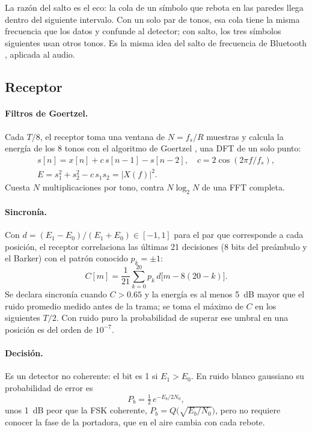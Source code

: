 \documentclass[10pt,twocolumn,letterpaper]{article}
\begin{document}
La razón del salto es el eco: la cola de un símbolo que rebota en las paredes llega dentro del siguiente intervalo. Con un solo par de tonos, esa cola tiene la misma frecuencia que los datos y confunde al detector; con salto, los tres símbolos siguientes usan otros tonos. Es la misma idea del salto de frecuencia de Bluetooth \cite{bluetooth}, aplicada al audio.

\subsection{Receptor}
\paragraph{Filtros de Goertzel.} Cada $T/8$, el receptor toma una ventana de $N = f_s/R$ muestras y calcula la energía de los 8 tonos con el algoritmo de Goertzel \cite{goertzel}, una DFT de un solo punto:
\begin{gather}
s[n] = x[n] + c\,s[n-1] - s[n-2], \quad c = 2\cos(2\pi f/f_s),\\
E = s_1^2 + s_2^2 - c\, s_1 s_2 = |X(f)|^2 .
\end{gather}
Cuesta $N$ multiplicaciones por tono, contra $N\log_2 N$ de una FFT completa.

\paragraph{Sincronía.} Con $d = (E_1 - E_0)/(E_1 + E_0) \in [-1, 1]$ para el par que corresponde a cada posición, el receptor correlaciona las últimas 21 decisiones (8 bits del preámbulo y el Barker) con el patrón conocido $p_k = \pm 1$:
\begin{equation}
C[m] = \frac{1}{21}\sum_{k=0}^{20} p_k\, d\big[m - 8(20 - k)\big].
\end{equation}
Se declara sincronía cuando $C > 0.65$ y la energía es al menos 5~dB mayor que el ruido promedio medido antes de la trama; se toma el máximo de $C$ en los siguientes $T/2$. Con ruido puro la probabilidad de superar ese umbral en una posición es del orden de $10^{-7}$.

\paragraph{Decisión.} Es un detector no coherente: el bit es 1 si $E_1 > E_0$. En ruido blanco gaussiano su probabilidad de error es \cite{proakis}
\begin{equation}
P_b = \tfrac{1}{2}\, e^{-E_b/2N_0},\label{eq:pb}
\end{equation}
unos 1~dB peor que la FSK coherente, $P_b = Q\big(\sqrt{E_b/N_0}\big)$, pero no requiere conocer la fase de la portadora, que en el aire cambia con cada rebote.
\end{document}
